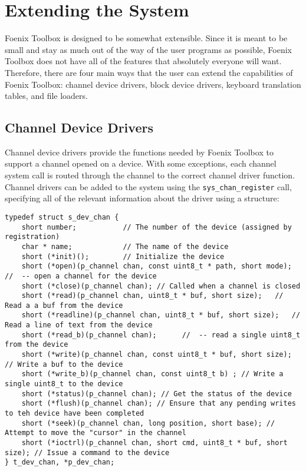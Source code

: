 \chapter{Extending the System}
Foenix Toolbox is designed to be somewhat extensible. Since it is meant to be small and stay as much out of the way of the user programs as possible, Foenix Toolbox does not have all of the features that absolutely everyone will want. Therefore, there are four main ways that the user can extend the capabilities of Foenix Toolbox: channel device drivers, block device drivers, keyboard translation tables, and file loaders.

\section{Channel Device Drivers}
Channel device drivers provide the functions needed by Foenix Toolbox to support a channel opened on a device. With some exceptions, each channel system call is routed through the channel to the correct channel driver function. Channel drivers can be added to the system using the \verb+sys_chan_register+ call, specifying all of the relevant information about the driver using a structure:

\begin{lstlisting}
typedef struct s_dev_chan {
    short number;           // The number of the device (assigned by registration)
    char * name;            // The name of the device
    short (*init)();        // Initialize the device
    short (*open)(p_channel chan, const uint8_t * path, short mode); //  -- open a channel for the device
    short (*close)(p_channel chan);	// Called when a channel is closed
    short (*read)(p_channel chan, uint8_t * buf, short size);	// Read a a buf from the device
    short (*readline)(p_channel chan, uint8_t * buf, short size);	// Read a line of text from the device
    short (*read_b)(p_channel chan);      //  -- read a single uint8_t from the device
    short (*write)(p_channel chan, const uint8_t * buf, short size);	// Write a buf to the device
    short (*write_b)(p_channel chan, const uint8_t b) ; // Write a single uint8_t to the device
    short (*status)(p_channel chan); // Get the status of the device
    short (*flush)(p_channel chan); // Ensure that any pending writes to teh device have been completed
    short (*seek)(p_channel chan, long position, short base); // Attempt to move the "cursor" in the channel
    short (*ioctrl)(p_channel chan, short cmd, uint8_t * buf, short size); // Issue a command to the device
} t_dev_chan, *p_dev_chan;
\end{lstlisting}

